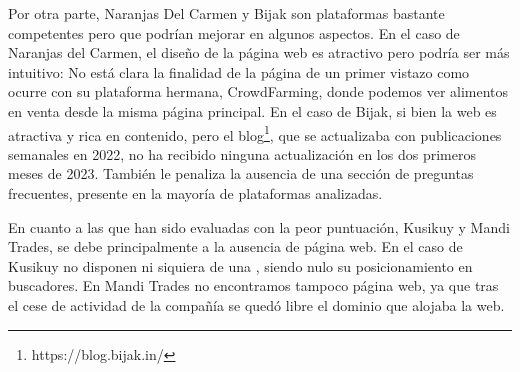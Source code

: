 Por otra parte, Naranjas Del Carmen y Bijak son plataformas bastante competentes pero que podrían mejorar en algunos aspectos. En el caso de Naranjas del Carmen, el diseño de la página web es atractivo pero podría ser más intuitivo: No está clara la finalidad de la página de un primer vistazo como ocurre con su plataforma hermana, CrowdFarming, donde podemos ver alimentos en venta desde la misma página principal. En el caso de Bijak, si bien la web es atractiva y rica en contenido, pero el blog\footnote{https://blog.bijak.in/}, que se actualizaba con publicaciones semanales en 2022, no ha recibido ninguna actualización en los dos primeros meses de 2023. También le penaliza la ausencia de una sección de preguntas frecuentes, presente en la mayoría de plataformas analizadas. 

En cuanto a las que han sido evaluadas con la peor puntuación, Kusikuy y Mandi Trades, se debe principalmente a la ausencia de página web. En el caso de Kusikuy no disponen ni siquiera de una , siendo nulo su posicionamiento en buscadores. En Mandi Trades no encontramos tampoco página web, ya que tras el cese de actividad de la compañía se quedó libre el dominio que alojaba la web.